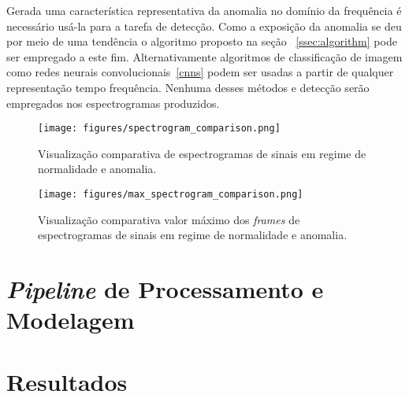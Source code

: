 Gerada uma característica representativa da anomalia no domínio da frequência
é necessário usá-la para a tarefa de detecção. Como a exposição da anomalia
se deu por meio de uma tendência o algoritmo proposto na seção
~\ref{ssec:algorithm} pode ser empregado a este fim. Alternativamente
algoritmos de classificação de imagem como redes neurais
convolucionais~\ref{cnns} podem ser usadas a partir de qualquer representação
tempo frequência. Nenhuma desses métodos e detecção serão empregados nos
espectrogramas produzidos.

\begin{figure}[H]
    \centering
    \texttt{[image: figures/spectrogram\_comparison.png]}
    \caption{Visualização comparativa de espectrogramas de sinais em regime de
    normalidade e anomalia.}
    \label{fig:spectrograms}
\end{figure}

\begin{figure}[H]
    \centering
    \texttt{[image: figures/max\_spectrogram\_comparison.png]}
    \caption{Visualização comparativa valor máximo dos \emph{frames} de
    espectrogramas de sinais em regime de normalidade e anomalia.}
    \label{fig:spectrograms_max}
\end{figure}

\section{\emph{Pipeline} de Processamento e Modelagem}

\section{Resultados}
